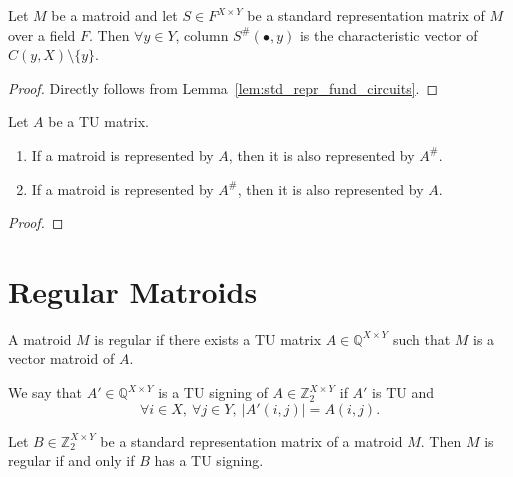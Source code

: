 \begin{lemma}\label{lem:std_repr_support_matrix_cols}
    Let $M$ be a matroid and let $S \in F^{X \times Y}$ be a standard representation matrix of $M$ over a field $F$. Then $\forall y \in Y$, column $S^{\#} (\bullet, y)$ is the characteristic vector of $C (y, X) \setminus \{y\}$.
\end{lemma}

\begin{proof}
    Directly follows from Lemma~\ref{lem:std_repr_fund_circuits}.
\end{proof}

\begin{lemma}\label{lem:repr_TU_iff_repr_TU_support}
    Let $A$ be a TU matrix.
    \begin{enumerate}
        \item If a matroid is represented by $A$, then it is also represented by $A^{\#}$.
        \item If a matroid is represented by $A^{\#}$, then it is also represented by $A$.
    \end{enumerate}
\end{lemma}

\begin{proof}
    \SeeLean
\end{proof}


\section{Regular Matroids}

\begin{definition}\label{def:regular}
    A matroid $M$ is regular if there exists a TU matrix $A \in \mathbb{Q}^{X \times Y}$ such that $M$ is a vector matroid of $A$.
\end{definition}

\begin{definition}\label{def:tu_signing}
    We say that $A' \in \mathbb{Q}^{X \times Y}$ is a TU signing of $A \in \mathbb{Z}_{2}^{X \times Y}$ if $A'$ is TU and
    \[
        \forall i \in X, \ \forall j \in Y, \ |A' (i, j)| = A (i, j).
    \]
\end{definition}

\begin{lemma}\label{lem:regular_defs_equiv}
    Let $B \in \mathbb{Z}_{2}^{X \times Y}$ be a standard representation matrix of a matroid $M$. Then $M$ is regular if and only if $B$ has a TU signing.
\end{lemma}

